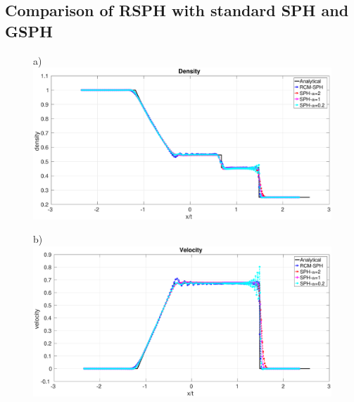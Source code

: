 \documentclass[review]{elsarticle}
\begin{document}
\subsection{Comparison of RSPH with standard SPH and GSPH}
\begin{figure}[htp]
    \centering
    \begin{minipage}{.495\textwidth}
        \centering a)
        \includegraphics[width=0.99 \textwidth,height=0.7\textwidth]{./Figures/Sod/RCM-Sod-SPH-alf-rho}
    \end{minipage}%
    \begin{minipage}{.495 \textwidth}
        \centering b)
        \includegraphics[width=0.99 \textwidth,height=0.7\textwidth]{./Figures/Sod/RCM-Sod-SPH-alf-v}
    \end{minipage}%

\end{figure}
\end{document}
